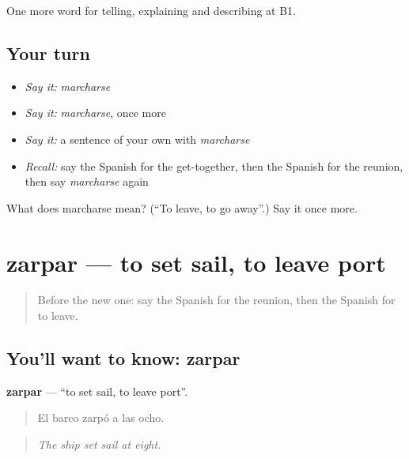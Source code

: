 \begin{grammarlens}[title={What you've built}]
One more word for telling, explaining and describing at B1.
\end{grammarlens}

\subsection*{Your turn}
\begin{itemize}
\raggedright
  \item \emph{Say it:} \emph{marcharse}
  \item \emph{Say it:} \emph{marcharse}, once more
  \item \emph{Say it:} a sentence of your own with \emph{marcharse}
  \item \emph{Recall:} say the Spanish for the get-together, then the Spanish for the reunion, then say \emph{marcharse} again
\end{itemize}

\begin{tcolorbox}[breakable,colback=teal!4,colframe=teal!35!black,title={Before you move on}]
What does marcharse mean? (\textquotedblleft{}To leave, to go away\textquotedblright{}.) Say it once more.
\end{tcolorbox}
\section[zarpar]{zarpar — to set sail, to leave port}

\label{lesson:ES-C561-zarpar}



\begin{quote}
Before the new one: say the Spanish for the reunion, then the Spanish for to leave.
\end{quote}

\subsection*{You'll want to know: zarpar}
\textbf{zarpar} — \textquotedblleft{}to set sail, to leave port\textquotedblright{}.

\begin{quote}
El barco zarpó a las ocho.
\end{quote}

\begin{quote}
\emph{The ship set sail at eight.}
\end{quote}

